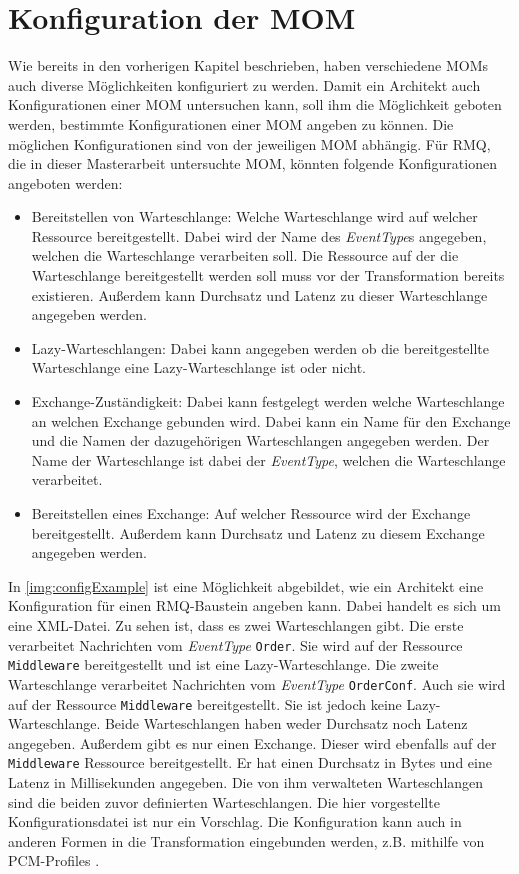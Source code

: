 \section{Konfiguration der MOM}
Wie bereits in den vorherigen Kapitel beschrieben, haben verschiedene MOMs auch diverse Möglichkeiten konfiguriert zu werden. Damit ein Architekt auch Konfigurationen einer MOM untersuchen kann, soll ihm die Möglichkeit geboten werden, bestimmte Konfigurationen einer MOM angeben zu können. Die möglichen Konfigurationen sind von der jeweiligen MOM abhängig. Für RMQ, die in dieser Masterarbeit untersuchte MOM, könnten folgende Konfigurationen angeboten werden:
\begin{itemize}
    \item Bereitstellen von Warteschlange: Welche Warteschlange wird auf welcher Ressource bereitgestellt. Dabei wird der Name des \emph{EventType}s angegeben, welchen die Warteschlange verarbeiten soll. Die Ressource auf der die Warteschlange bereitgestellt werden soll muss vor der Transformation bereits existieren. Außerdem kann Durchsatz und Latenz zu dieser Warteschlange angegeben werden.
    \item Lazy-Warteschlangen: Dabei kann angegeben werden ob die bereitgestellte Warteschlange eine Lazy-Warteschlange ist oder nicht. 
    \item Exchange-Zuständigkeit: Dabei kann festgelegt werden welche Warteschlange an welchen Exchange gebunden wird. Dabei kann ein Name für den Exchange und die Namen der dazugehörigen Warteschlangen angegeben werden. Der Name der Warteschlange ist dabei der \emph{EventType}, welchen die Warteschlange verarbeitet.
    \item Bereitstellen eines Exchange: Auf welcher Ressource wird der Exchange bereitgestellt. Außerdem kann Durchsatz und Latenz zu diesem Exchange angegeben werden.
\end{itemize}
In \autoref{img:configExample} ist eine Möglichkeit abgebildet, wie ein Architekt eine Konfiguration für einen RMQ-Baustein angeben kann. Dabei handelt es sich um eine XML-Datei. Zu sehen ist, dass es zwei Warteschlangen gibt. Die erste verarbeitet Nachrichten vom \emph{EventType} \texttt{Order}. Sie wird auf der Ressource \texttt{Middleware} bereitgestellt und ist eine Lazy-Warteschlange. Die zweite Warteschlange verarbeitet Nachrichten vom \emph{EventType} \texttt{OrderConf}. Auch sie wird auf der Ressource \texttt{Middleware} bereitgestellt. Sie ist jedoch keine Lazy-Warteschlange. Beide Warteschlangen haben weder Durchsatz noch Latenz angegeben. Außerdem gibt es nur einen Exchange. Dieser wird ebenfalls auf der \texttt{Middleware} Ressource bereitgestellt. Er hat einen Durchsatz in Bytes und eine Latenz in Millisekunden angegeben. Die von ihm verwalteten Warteschlangen sind die beiden zuvor definierten Warteschlangen. Die hier vorgestellte Konfigurationsdatei ist nur ein Vorschlag. Die Konfiguration kann auch in anderen Formen in die Transformation eingebunden werden, z.B. mithilfe von PCM-Profiles \cite{kramer2012b}.



